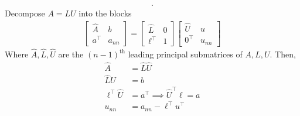 \documentclass{report}
\begin{document}
\begin{itemize}
\begin{align*}
            .\end{align*}
            Decompose $A = LU$ into the blocks
            \begin{align*}
                \begin{bmatrix}
                    \hat{A} & b \\
                    a^{\top} & a_{nn}
                \end{bmatrix}
                = 
                \begin{bmatrix}
                    \hat{L} & 0 \\
                    \ell^{\top} & 1
                \end{bmatrix}
                \begin{bmatrix}
                    \hat{U} & u \\
                    0^{\top} & u_{nn}
                \end{bmatrix}
            \end{align*}
            Where $\hat{A}, \hat{L}, \hat{U}$ are the $(n-1)^{\text{th}}$ leading principal submatrices of $A,L,U$.
            \bigbreak \noindent 
            Then, 
            \begin{align*}
                \hat{A} &= \hat{L}\hat{U} \\
                \hat{L}U &= b  \\
                \ell^{\top} \hat{U} &= a^{\top} \implies \hat{U}^{\top}\ell = a \\
                u_{nn} &= a_{nn} - \ell^{\top}u^{\top}
            \end{align*}

\end{itemize}
\end{document}
